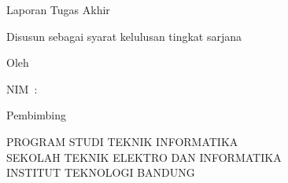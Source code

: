 
\begin{center}
  \smallskip
  \thispagestyle{empty}
  \Large \bfseries \MakeUppercase{\thetitle}
  \vfill

  \Large Laporan Tugas Akhir

  \large Disusun sebagai syarat kelulusan tingkat sarjana
  \vfill

  \large Oleh
  
  \large \uppercase{\theauthor}

  \large NIM~:~\uppercase{\nim}
  
  \vfill

  \large Pembimbing

  \large \uppercase{\supervisor{}} 
  
  \large
  \uppercase{Program Studi Teknik Informatika \\
      Sekolah Teknik Elektro dan Informatika \\
      Institut Teknologi Bandung}

  \thedate{}
  
\end{center}